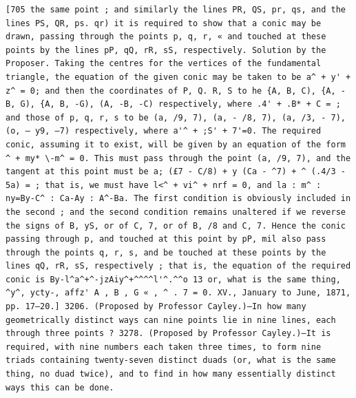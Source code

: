 \documentclass[11pt,a4paper]{book}
\begin{document}
\newpage
\setcounter{page}{570}
\begin{verbatim}
[705 the same point ; and similarly the lines PR, QS, pr, qs, and the lines PS, QR, ps. qr) it is required to show that a conic may be drawn, passing through the points p, q, r, « and touched at these points by the lines pP, qQ, rR, sS, respectively. Solution by the Proposer. Taking the centres for the vertices of the fundamental triangle, the equation of the given conic may be taken to be a^ + y' + z^ = 0; and then the coordinates of P, Q. R, S to he {A, B, C), {A, - B, G), {A, B, -G), (A, -B, -C) respectively, where .4' + .B* + C = ; and those of p, q, r, s to be (a, /9, 7), (a, - /8, 7), (a, /3, - 7), (o, — y9, —7) respectively, where a'^ + ;S' + 7'=0. The required conic, assuming it to exist, will be given by an equation of the form ^ + my* \-m^ = 0. This must pass through the point (a, /9, 7), and the tangent at this point must be a; (£7 - C/8) + y (Ca - ^7) + ^ (.4/3 - 5a) = ; that is, we must have l<^ + vi^ + nrf = 0, and la : m^ : ny=By-C^ : Ca-Ay : A^-Ba. The first condition is obviously included in the second ; and the second condition remains unaltered if we reverse the signs of B, yS, or of C, 7, or of B, /8 and C, 7. Hence the conic passing through p, and touched at this point by pP, mil also pass through the points q, r, s, and be touched at these points by the lines qQ, rR, sS, respectively ; that is, the equation of the required conic is By-l^a^+^-jzAiy^+^^^^l'^.^^o 13 or, what is the same thing, ^y^, ycty-, affz' A , B , G « , ^ . 7 = 0. XV., January to June, 1871, pp. 17—20.] 3206. (Proposed by Professor Cayley.)—In how many geometrically distinct ways can nine points lie in nine lines, each through three points ? 3278. (Proposed by Professor Cayley.)—It is required, with nine numbers each taken three times, to form nine triads containing twenty-seven distinct duads (or, what is the same thing, no duad twice), and to find in how many essentially distinct ways this can be done. 
\end{verbatim}
\end{document}
